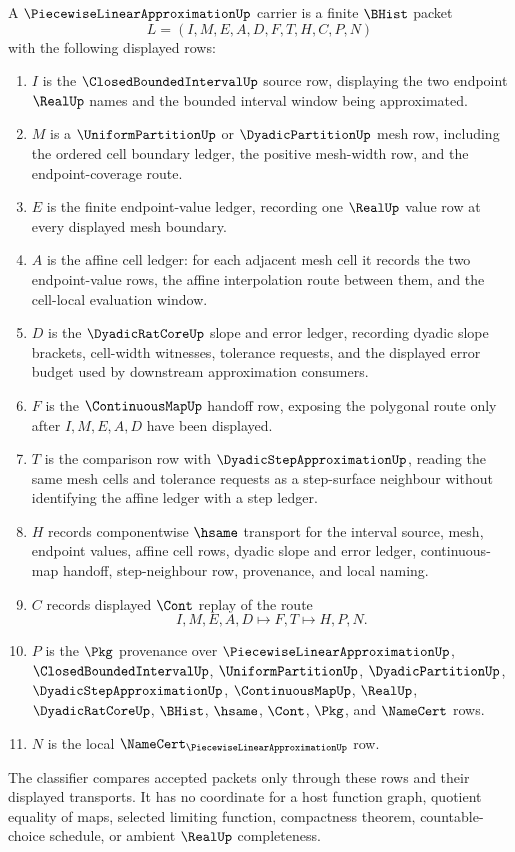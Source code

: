\begin{definition}
\label{def:piecewise-linear-approximation-carrier}
A $\PiecewiseLinearApproximationUp$ carrier is a finite $\BHist$ packet
$$
L=(I,M,E,A,D,F,T,H,C,P,N)
$$
with the following displayed rows:
\begin{enumerate}
\item $I$ is the $\ClosedBoundedIntervalUp$ source row, displaying the two endpoint $\RealUp$ names and the bounded interval window being approximated.
\item $M$ is a $\UniformPartitionUp$ or $\DyadicPartitionUp$ mesh row, including the ordered cell boundary ledger, the positive mesh-width row, and the endpoint-coverage route.
\item $E$ is the finite endpoint-value ledger, recording one $\RealUp$ value row at every displayed mesh boundary.
\item $A$ is the affine cell ledger: for each adjacent mesh cell it records the two endpoint-value rows, the affine interpolation route between them, and the cell-local evaluation window.
\item $D$ is the $\DyadicRatCoreUp$ slope and error ledger, recording dyadic slope brackets, cell-width witnesses, tolerance requests, and the displayed error budget used by downstream approximation consumers.
\item $F$ is the $\ContinuousMapUp$ handoff row, exposing the polygonal route only after $I,M,E,A,D$ have been displayed.
\item $T$ is the comparison row with $\DyadicStepApproximationUp$, reading the same mesh cells and tolerance requests as a step-surface neighbour without identifying the affine ledger with a step ledger.
\item $H$ records componentwise $\hsame$ transport for the interval source, mesh, endpoint values, affine cell rows, dyadic slope and error ledger, continuous-map handoff, step-neighbour row, provenance, and local naming.
\item $C$ records displayed $\Cont$ replay of the route
$$
I,M,E,A,D \longmapsto F,T \longmapsto H,P,N .
$$
\item $P$ is the $\Pkg$ provenance over $\PiecewiseLinearApproximationUp$, $\ClosedBoundedIntervalUp$, $\UniformPartitionUp$, $\DyadicPartitionUp$, $\DyadicStepApproximationUp$, $\ContinuousMapUp$, $\RealUp$, $\DyadicRatCoreUp$, $\BHist$, $\hsame$, $\Cont$, $\Pkg$, and $\NameCert$ rows.
\item $N$ is the local $\NameCert_{\PiecewiseLinearApproximationUp}$ row.
\end{enumerate}
The classifier compares accepted packets only through these rows and their displayed transports. It has no coordinate for a host function graph, quotient equality of maps, selected limiting function, compactness theorem, countable-choice schedule, or ambient $\RealUp$ completeness.
\end{definition}

